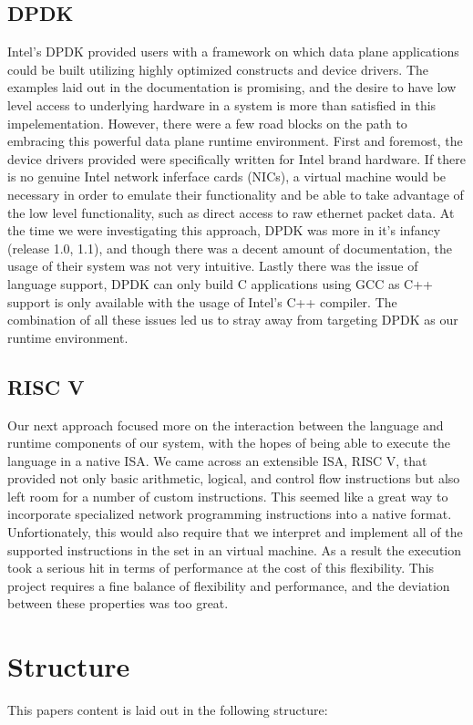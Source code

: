 \subsection{DPDK}
Intel's DPDK provided users with a framework on which data plane applications
could be built utilizing highly optimized constructs and device drivers. The
examples laid out in the documentation is promising, and the desire to have
low level access to underlying hardware in a system is more than satisfied
in this impelementation. However, there were a few road blocks on the path to
embracing this powerful data plane runtime environment. First and foremost, the
device drivers provided were specifically written for Intel brand hardware. If
there is no genuine Intel network inferface cards (NICs), a virtual machine
would be necessary in order to emulate their functionality and be able to take
advantage of the low level functionality, such as direct access to raw
ethernet packet data. At the time we were investigating this approach, DPDK was
more in it's infancy (release 1.0, 1.1), and though there was a decent amount
of documentation, the usage of their system was not very intuitive. Lastly
there was the issue of language support, DPDK can only build C applications
using GCC as C++ support is only available with the usage of Intel's C++
compiler. The combination of all these issues led us to stray away from
targeting DPDK as our runtime environment.

\subsection{RISC V}
Our next approach focused more on the interaction between the language and
runtime components of our system, with the hopes of being able to execute
the language in a native ISA. We came across an extensible ISA, RISC V, that
provided not only basic arithmetic, logical, and control flow instructions but
also left room for a number of custom instructions. This seemed like a great
way to incorporate specialized network programming instructions into a native
format. Unfortionately, this would also require that we interpret and implement
all of the supported instructions in the set in an virtual machine. As a result
the execution took a serious hit in terms of performance at the cost of this
flexibility. This project requires a fine balance of flexibility and
performance, and the deviation between these properties was too great.

\section{Structure}
This papers content is laid out in the following structure:
